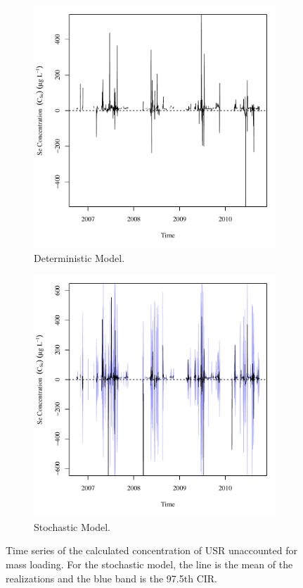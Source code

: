 \begin{figure}[htbp]
\centering
	\begin{subfigure}{0.5\textwidth}
		\centering
		\includegraphics[width=0.9\linewidth]{"Figures/Results_USR/Deterministic/Balance C"}
		\caption{Deterministic Model.}
	\end{subfigure}%
	\begin{subfigure}{0.5\textwidth}
		\centering
		\includegraphics[width=0.9\linewidth]{"Figures/Results_USR/Stochastic/Balance C"}
		\caption{Stochastic Model.}
	\end{subfigure}
	\caption[Time series of the calculated concentration of USR unaccounted for mass loading.]{Time series of the calculated concentration of USR unaccounted for mass loading.  For the stochastic model, the line is the mean of the realizations and the blue band is the 97.5th CIR.}
	\label{fig:USRConc}
\end{figure}

